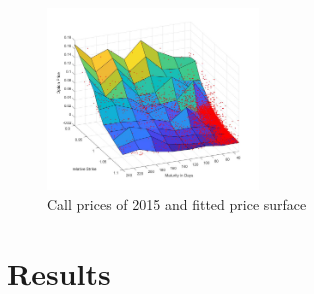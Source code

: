 \documentclass{article}
\begin{document}
\begin{figure}[!ht]
   \centering
  \includegraphics[width=0.5\textwidth]{calls_surface_sp500_2015.jpg}
   \caption{Call prices of 2015 and fitted price surface}
    \label{fig:real_surf}
\end{figure}
\section{Results}
\end{document}
